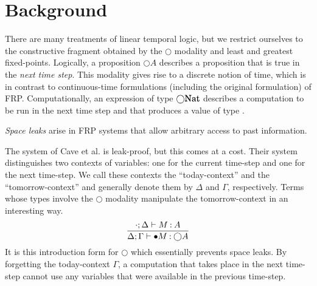 \documentclass[acmsmall, natbib=false]{acmart}
\renewcommand{\circle}{\bigcirc}
\begin{document}
\section{Background}
\label{sec:background}

There are many treatments of linear temporal logic, but we restrict ourselves
to the constructive fragment obtained by the $\circle$ modality and least and
greatest fixed-points.
Logically, a proposition $\circle A$ describes a proposition that is true in
the \emph{next time step}.
This modality gives rise to a discrete notion of time, which is in contrast to
continuous-time formulations (including the original
formulation\cite{frp-hudak}) of FRP.
Computationally, an expression of type $\circle \mathqd{Nat}$ describes a
computation to be run in the next time step and that produces a value of type
.

\emph{Space leaks} arise in FRP systems that allow arbitrary access to past
information.

The system of Cave et al.\cite{ltl} is leak-proof, but this comes at a cost.
Their system distinguishes two contexts of variables: one for the current
time-step and one for the next time-step. We call these contexts the
``today-context'' and the ``tomorrow-context'' and generally denote them by
$\Delta$ and $\Gamma$, respectively.
Terms whose types involve the $\circle$ modality manipulate the
tomorrow-context in an interesting way.
%
\begin{equation*}
  \infer{
    \Delta; \Gamma \proves \bullet M \hastype \circle A
  }{
    \cdot; \Delta \proves M \hastype A
  }
\end{equation*}
%
It is this introduction form for $\circle$ which essentially prevents space
leaks. By forgetting the today-context $\Gamma$, a computation that takes place
in the next time-step cannot use any variables that were available in the
previous time-step.
\end{document}
